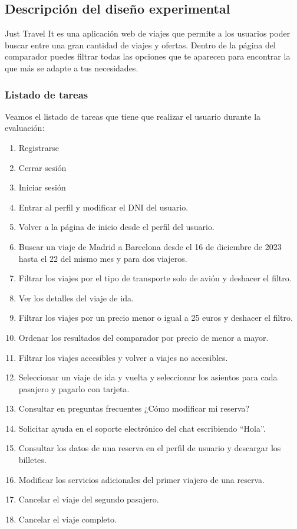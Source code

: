 \subsection{Descripción del diseño experimental}
Just Travel It es una aplicación web de viajes que permite a los usuarios poder buscar entre una gran cantidad de viajes y ofertas. Dentro de la página del 
comparador puedes filtrar todas las opciones que te aparecen para encontrar la que más se adapte a tus necesidades.

\subsubsection{Listado de tareas}
Veamos el listado de tareas que tiene que realizar el usuario durante la evaluación:
\begin{enumerate}
    \item Registrarse
    \item Cerrar sesión
    \item Iniciar sesión
    \item Entrar al perfil y modificar el DNI del usuario.
    \item Volver a la página de inicio desde el perfil del usuario.
    \item Buscar un viaje de Madrid a Barcelona desde el 16 de diciembre de 2023 hasta el 22 del mismo mes y para dos viajeros.
    \item Filtrar los viajes por el tipo de transporte solo de avión y deshacer el filtro.
    \item Ver los detalles del viaje de ida.
    \item Filtrar los viajes por un precio menor o igual a 25 euros y deshacer el filtro.
    \item Ordenar los resultados del comparador por precio de menor a mayor.
    \item Filtrar los viajes accesibles y volver a viajes no accesibles.
    \item Seleccionar un viaje de ida y vuelta y seleccionar los asientos para cada pasajero y pagarlo con tarjeta.
    \item Consultar en preguntas frecuentes ¿Cómo modificar mi reserva?
    \item Solicitar ayuda en el soporte electrónico del chat escribiendo “Hola”.
    \item Consultar los datos de una reserva en el perfil de usuario y descargar los billetes.
    \item Modificar los servicios adicionales del primer viajero de una reserva.
    \item Cancelar el viaje del segundo pasajero.
    \item Cancelar el viaje completo.    
\end{enumerate}

